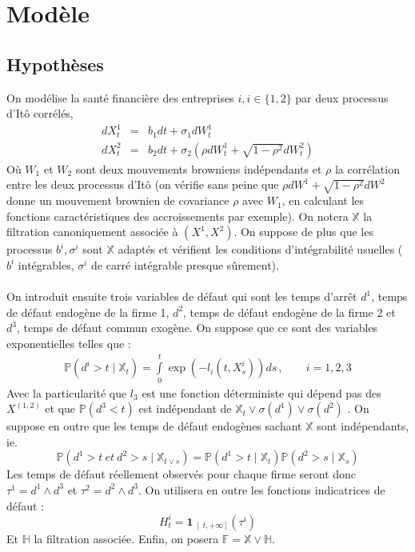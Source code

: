 \documentclass[a4paper]{article}
\begin{document}
\section{Modèle}
\subsection{Hypothèses}
On modélise la santé financière des entreprises $i, i \in \lbrace 1, 2 \rbrace$ par deux processus d'Itô corrélés, 
\begin{eqnarray}
dX^{1}_{t} &=& b_{1}dt + \sigma_{1}dW_{t}^{1} \\
dX^{2}_{t} &=& b_{2}dt + \sigma_{2} \left(\rho dW_{t}^{1} + \sqrt{1 - \rho^{2}} dW_{t}^{2}\right)
\end{eqnarray}
Où $W_{1}$ et $W_{2}$ sont deux mouvements browniens indépendants et $\rho$ la corrélation entre les deux processus d'Itô (on vérifie sans peine que $\rho dW^{1} + \sqrt{1 - \rho^{2}} dW^{2}$ donne un mouvement brownien de covariance $\rho$ avec $W_{1}$, en calculant les fonctions caractéristiques des accroissements par exemple). On notera $\mathbb{X}$ la filtration canoniquement associée à $(X^{1}, X^{2})$. On suppose de plus que les processus $b^{i}, \sigma^{i}$ sont $\mathbb{X}$ adaptés et vérifient les conditions d'intégrabilité usuelles ($b^{i}$ intégrables, $\sigma^{i}$ de carré intégrable presque sûrement). \\ \\
On introduit ensuite trois variables de défaut qui sont les temps d'arrêt $d^{1}$, temps de défaut endogène de la firme 1, $d^{2}$, temps de défaut endogène de la firme 2 et $d^{3}$, temps de défaut commun exogène. On suppose que ce sont des variables exponentielles telles que :
\begin{eqnarray}
\mathbb{P}\left( d^{i} > t \mid \mathbb{X}_{t} \right) = \int \limits_{0}^{t} \exp \left( -l_{i} (t, X^{i}_{s}) \right) ds\,,\qquad  i = 1, 2, 3
\end{eqnarray}
Avec la particularité que $l_{3}$ est une fonction déterministe qui dépend pas des $X^{(1,2)}$ et que $\mathbb{P} (d^{3} < t)$ est indépendant de $\mathbb{X}_{t} \vee \sigma(d^{1}) \vee \sigma(d^{2})$ .
On suppose en outre que les temps de défaut endogènes sachant $\mathbb{X}$ sont indépendants, ie. 
\begin{equation*}
\mathbb{P} \left( d^{1} > t \ et \ d^{2} > s \mid \mathbb{X}_{t\vee s} \right) = \mathbb{P} \left( d^{1} > t \mid \mathbb{X}_{t} \right)  \mathbb{P} \left( d^{2} > s \mid \mathbb{X}_{s} \right)
\end{equation*}
Les temps de défaut réellement observés pour chaque firme seront donc $\tau^{1} = d^{1} \wedge d^{3}$ et  $\tau^{2} = d^{2} \wedge d^{3}$. On utilisera en outre les fonctions indicatrices de défaut :
\begin{equation*}
H^{i}_{t} = \mathbf{1}_{\left]t, +\infty \right]} (\tau^{i})
\end{equation*}
Et $\mathbb{H}$ la filtration associée. Enfin, on posera $\mathbb{F} = \mathbb{X} \vee \mathbb{H}$. \\ \\
\end{document}
